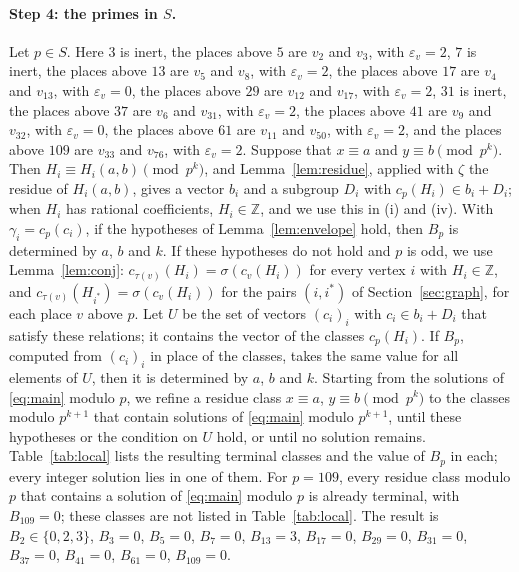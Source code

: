 \documentclass[11pt]{article}
\newcommand{\Z}{\mathbb{Z}}
\begin{document}
\paragraph{Step 4: the primes in $S$.} Let $p\in S$. Here $3$ is inert, the places above $5$ are $v_{2}$ and $v_{3}$, with $\varepsilon_v=2$, $7$ is inert, the places above $13$ are $v_{5}$ and $v_{8}$, with $\varepsilon_v=2$, the places above $17$ are $v_{4}$ and $v_{13}$, with $\varepsilon_v=0$, the places above $29$ are $v_{12}$ and $v_{17}$, with $\varepsilon_v=2$, $31$ is inert, the places above $37$ are $v_{6}$ and $v_{31}$, with $\varepsilon_v=2$, the places above $41$ are $v_{9}$ and $v_{32}$, with $\varepsilon_v=0$, the places above $61$ are $v_{11}$ and $v_{50}$, with $\varepsilon_v=2$, and the places above $109$ are $v_{33}$ and $v_{76}$, with $\varepsilon_v=2$. Suppose that $x\equiv a$ and $y\equiv b\pmod{p^k}$. Then $H_i\equiv H_i(a,b)\pmod{p^k}$, and Lemma~\ref{lem:residue}, applied with $\zeta$ the residue of $H_i(a,b)$, gives a vector $b_i$ and a subgroup $D_i$ with $c_p(H_i)\in b_i+D_i$; when $H_i$ has rational coefficients, $H_i\in\Z$, and we use this in (i) and (iv). With $\gamma_i=c_p(c_i)$, if the hypotheses of Lemma~\ref{lem:envelope} hold, then $B_p$ is determined by $a$, $b$ and $k$. If these hypotheses do not hold and $p$ is odd, we use Lemma~\ref{lem:conj}: $c_{\tau(v)}(H_i)=\sigma(c_v(H_i))$ for every vertex $i$ with $H_i\in\Z$, and $c_{\tau(v)}(H_{i^*})=\sigma(c_v(H_i))$ for the pairs $(i,i^*)$ of Section~\ref{sec:graph}, for each place $v$ above $p$. Let $U$ be the set of vectors $(c_i)_i$ with $c_i\in b_i+D_i$ that satisfy these relations; it contains the vector of the classes $c_p(H_i)$. If $B_p$, computed from $(c_i)_i$ in place of the classes, takes the same value for all elements of $U$, then it is determined by $a$, $b$ and $k$. Starting from the solutions of \eqref{eq:main} modulo $p$, we refine a residue class $x\equiv a$, $y\equiv b\pmod{p^k}$ to the classes modulo $p^{k+1}$ that contain solutions of \eqref{eq:main} modulo $p^{k+1}$, until these hypotheses or the condition on $U$ hold, or until no solution remains. Table~\ref{tab:local} lists the resulting terminal classes and the value of $B_p$ in each; every integer solution lies in one of them. For $p=109$, every residue class modulo $p$ that contains a solution of \eqref{eq:main} modulo $p$ is already terminal, with $B_{109}=0$; these classes are not listed in Table~\ref{tab:local}. The result is $B_{2}\in\{0,2,3\}$, $B_{3}=0$, $B_{5}=0$, $B_{7}=0$, $B_{13}=3$, $B_{17}=0$, $B_{29}=0$, $B_{31}=0$, $B_{37}=0$, $B_{41}=0$, $B_{61}=0$, $B_{109}=0$.
\end{document}
